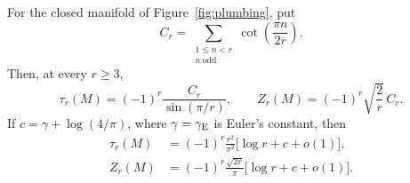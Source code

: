 \begin{theorem}\label{thm:hcase}
For the closed manifold of Figure~\ref{fig:plumbing}, put
\[
 C_r=\sum_{\substack{1\le n<r\\ n\ \mathrm{odd}}}\cot\!\left(\frac{\pi n}{2r}\right).
\]
Then, at every \(r\ge3\),
\begin{equation}\label{eq:exact}
 \tau_r(M)=(-1)^r\frac{C_r}{\sin(\pi/r)},
 \qquad
 Z_r(M)=(-1)^r\sqrt{\frac2r}\,C_r.
\end{equation}
If \(c=\gamma+\log(4/\pi)\), where \(\gamma=\gamma_{\rm E}\) is Euler's constant, then
\begin{align}
 \tau_r(M)&=(-1)^r\frac{r^2}{\pi^2}\bigl[\log r+c+o(1)\bigr],\label{eq:tauasy}\\
 Z_r(M)&=(-1)^r\frac{\sqrt{2r}}{\pi}\bigl[\log r+c+o(1)\bigr].\label{eq:Zasy}
\end{align}
\end{theorem}


